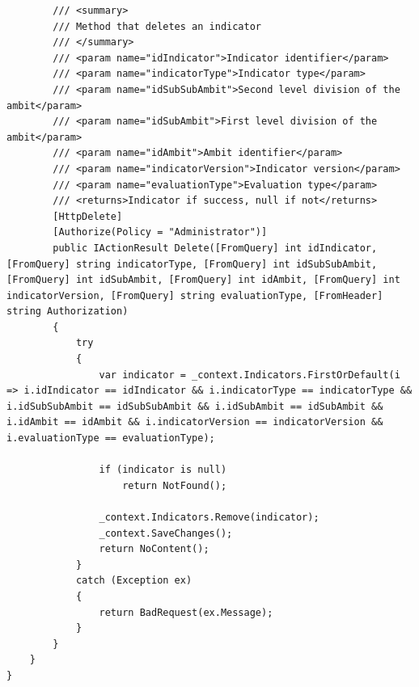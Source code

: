 \begin{itemize}
\begin{itemize}
\begin{lstlisting}
        /// <summary>
        /// Method that deletes an indicator
        /// </summary>
        /// <param name="idIndicator">Indicator identifier</param>
        /// <param name="indicatorType">Indicator type</param>
        /// <param name="idSubSubAmbit">Second level division of the ambit</param>
        /// <param name="idSubAmbit">First level division of the ambit</param>
        /// <param name="idAmbit">Ambit identifier</param>
        /// <param name="indicatorVersion">Indicator version</param>
        /// <param name="evaluationType">Evaluation type</param>
        /// <returns>Indicator if success, null if not</returns>
        [HttpDelete]
        [Authorize(Policy = "Administrator")]
        public IActionResult Delete([FromQuery] int idIndicator, [FromQuery] string indicatorType, [FromQuery] int idSubSubAmbit, [FromQuery] int idSubAmbit, [FromQuery] int idAmbit, [FromQuery] int indicatorVersion, [FromQuery] string evaluationType, [FromHeader] string Authorization)
        {
            try
            {
                var indicator = _context.Indicators.FirstOrDefault(i => i.idIndicator == idIndicator && i.indicatorType == indicatorType && i.idSubSubAmbit == idSubSubAmbit && i.idSubAmbit == idSubAmbit && i.idAmbit == idAmbit && i.indicatorVersion == indicatorVersion && i.evaluationType == evaluationType);

                if (indicator is null)
                    return NotFound();

                _context.Indicators.Remove(indicator);
                _context.SaveChanges();
                return NoContent();
            }
            catch (Exception ex)
            {
                return BadRequest(ex.Message);
            }
        }
    }
}


\end{lstlisting}
\end{itemize}
\end{itemize}
